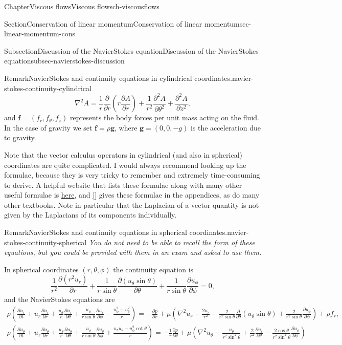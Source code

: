 \documentclass[oneside,10pt,]{book}
\newcommand{\xreffont}{\relax}
\numberwithin{equation}{section}
\newcommand{\pd}[2]{\frac{\partial#1}{\partial#2}}
\renewcommand{\bf}{\boldsymbol{f}}
\newcommand{\bg}{\boldsymbol{g}}
\begin{document}
\begin{chapterptx}{Chapter}{Viscous flows}{}{Viscous flows}{}{}{ch-viscousflows}
\begin{sectionptx}{Section}{Conservation of linear momentum}{}{Conservation of linear momentum}{}{}{sec-linear-momentum-cons}
\begin{subsectionptx}{Subsection}{Discussion of the Navier\textendash{}Stokes equation}{}{Discussion of the Navier\textendash{}Stokes equation}{}{}{subsec-navierstokes-discussion}
\begin{remark}{Remark}{Navier\textendash{}Stokes and continuity equations in cylindrical coordinates.}{navier-stokes-continuity-cylindrical}
\begin{equation*}
\nabla^2A=\frac1r\pd{}{r}\left(r\pd{A}{r}\right)+\frac1{r^2}\pd{^2A}{\theta^2}+\pd{^2A}{z^2},
\end{equation*}
and \(\bf=(f_r,f_\theta,f_z)\) represents the body forces per unit mass acting on the fluid. In the case of gravity we set \(\bf=\rho{\bg}\), where \(\bg=(0,0,-g)\) is the acceleration due to gravity.%
\par
Note that the vector calculus operators in cylindrical (and also in spherical) coordinates are quite complicated. I would always recommend looking up the formulae, because they is very tricky to remember and extremely time-consuming to derive. A helpful website that lists these formulae along with many other useful formulae is \href{http://en.wikipedia.org/wiki/Del_in_cylindrical_and_spherical_coordinates}{here}, and \hyperlink{ref-acheson}{[{\xreffont 4}]} gives these formulae in the appendices, as do many other textbooks. Note in particular that the Laplacian of a vector quantity is not given by the Laplacians of its components individually.%
\end{remark}
\begin{remark}{Remark}{Navier\textendash{}Stokes and continuity equations in spherical coordinates.}{navier-stokes-continuity-spherical}%
\emph{You do not need to be able to recall the form of these equations, but you could be provided with them in an exam and asked to use them.}%
\par
In spherical coordinates \((r,\theta,\phi)\) the continuity equation is%
\begin{equation*}
\frac1{r^2}\pd{(r^2u_r)}{r}+\frac1{r\sin\theta}\pd{(u_\theta\sin\theta)}{\theta}+\frac1{r\sin\theta}\pd{u_\phi}{\phi}=0,
\end{equation*}
and the Navier\textendash{}Stokes equations are%
\begin{gather*}
\rho\left(\pd{u_r}{t}+u_r \pd{u_r}{r}+\frac{u_{\theta}}{r}\pd{u_r}{\theta}+\frac{u_{\phi}}{r \sin\theta}\pd{u_r}{\phi}-\frac{u_{\phi}^2+u_{\theta}^2}{r}\right)
=-\pd{p}{r}
+\mu\left(\nabla^2u_r-\frac{2u_r}{r^2}-\frac2{r^2\sin\theta}\pd{}{\theta}\left(u_\theta\sin\theta\right)
+\frac{2}{r^2\sin\theta}\pd{u_{\phi}}{\phi}
\right)
+\rho f_r,\\
\rho\left(\pd{u_\theta}{t}+u_r\pd{u_{\theta}}{r}+\frac{u_{\theta}}{r}\pd{u_{\theta}}{\theta}+\frac{u_{\phi}}{r\sin\theta}\pd{u_{\theta}}{\phi}+\frac{u_ru_{\theta}-u_{\phi}^2\cot\theta}{r}\right)
=-\frac1r\pd{p}{\theta}
+\mu\left(\nabla^2u_\theta-\frac{u_\theta}{r^2\sin^2\theta}+\frac2{r^2}\pd{u_r}{\theta}-\frac{2\cos\theta}{r^2\sin^2\theta}\pd{u_\phi}{\phi}\right)

\end{gather*}
\end{remark}
\end{subsectionptx}
\end{sectionptx}
\end{chapterptx}
\end{document}
